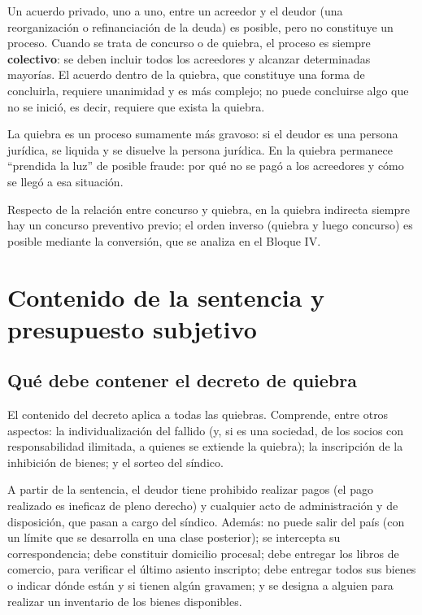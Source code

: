 \documentclass[12pt,oneside]{book}
\begin{document}
Un acuerdo privado, uno a uno, entre un acreedor y el deudor (una reorganización o refinanciación de la deuda) es posible, pero no constituye un proceso. Cuando se trata de concurso o de quiebra, el proceso es siempre \textbf{colectivo}: se deben incluir todos los acreedores y alcanzar determinadas mayorías. El acuerdo dentro de la quiebra, que constituye una forma de concluirla, requiere unanimidad y es más complejo; no puede concluirse algo que no se inició, es decir, requiere que exista la quiebra.

La quiebra es un proceso sumamente más gravoso: si el deudor es una persona jurídica, se liquida y se disuelve la persona jurídica. En la quiebra permanece ``prendida la luz'' de posible fraude: por qué no se pagó a los acreedores y cómo se llegó a esa situación.

Respecto de la relación entre concurso y quiebra, en la quiebra indirecta siempre hay un concurso preventivo previo; el orden inverso (quiebra y luego concurso) es posible mediante la conversión, que se analiza en el Bloque IV.

\section{Contenido de la sentencia y presupuesto subjetivo}

\subsection{Qué debe contener el decreto de quiebra}

El contenido del decreto aplica a todas las quiebras. Comprende, entre otros aspectos: la individualización del fallido (y, si es una sociedad, de los socios con responsabilidad ilimitada, a quienes se extiende la quiebra); la inscripción de la inhibición de bienes; y el sorteo del síndico.

A partir de la sentencia, el deudor tiene prohibido realizar pagos (el pago realizado es ineficaz de pleno derecho) y cualquier acto de administración y de disposición, que pasan a cargo del síndico. Además: no puede salir del país (con un límite que se desarrolla en una clase posterior); se intercepta su correspondencia; debe constituir domicilio procesal; debe entregar los libros de comercio, para verificar el último asiento inscripto; debe entregar todos sus bienes o indicar dónde están y si tienen algún gravamen; y se designa a alguien para realizar un inventario de los bienes disponibles.
\end{document}
